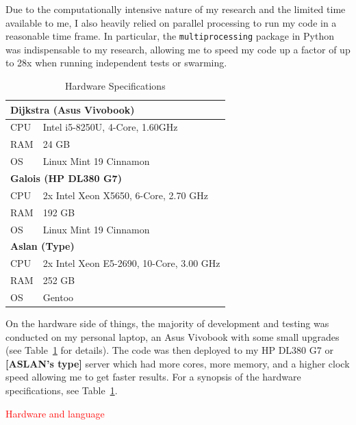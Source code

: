 \documentclass[oneside,12pt,openany]{book}
\begin{document}
	Due to the computationally intensive nature of my research and the limited time available to me, I also heavily relied on parallel processing to run my code in a reasonable time frame. In particular, the \texttt{multiprocessing} package in Python was indispensable to my research, allowing me to speed my code up a factor of up to 28x when running independent tests or swarming.
	
	\begin{table}[h!]
		\centering
		\begin{tabular}{|l|l|}
			\hline
			\multicolumn{2}{|l|}{\textbf{Dijkstra (Asus Vivobook)}} \\ \hline
			CPU     & Intel i5-8250U, 4-Core, 1.60GHz     \\ \hline
			RAM     & 24 GB                                \\ \hline
			OS      & Linux Mint 19 Cinnamon               \\ \hline
			\multicolumn{2}{|l|}{\textbf{Galois (HP DL380 G7)}}     \\ \hline
			CPU     &  2x Intel Xeon X5650, 6-Core, 2.70 GHz       \\ \hline
			RAM     & 192 GB                               \\ \hline
			OS      & Linux Mint 19 Cinnamon               \\ \hline
			\multicolumn{2}{|l|}{\textbf{Aslan (Type)}}                         \\ \hline
			CPU&    2x  Intel Xeon E5-2690, 10-Core, 3.00 GHz    \\ \hline
			RAM&    252 GB                                  \\ \hline
			OS&    Gentoo                               \\ \hline
		\end{tabular}
		\caption{Hardware Specifications}
		\label{tab:hardware}
	\end{table}

	On the hardware side of things, the majority of development and testing was conducted on my personal laptop, an Asus Vivobook with some small upgrades (see Table~\ref{tab:hardware} for details). The code was then deployed to my HP DL380 G7 or \textbf{[ASLAN's type]} server which had more cores, more memory, and a higher clock speed allowing me to get faster results. For a synopsis of the hardware specifications, see Table~\ref{tab:hardware}. 
	
	\textcolor{red}{Hardware and language}
	
\end{document}
